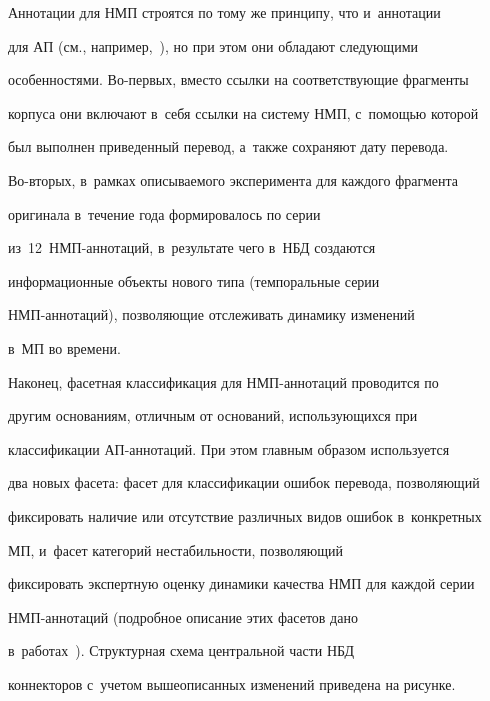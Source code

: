      


     Аннотации для НМП строятся по тому же принципу, что и~аннотации 


для АП (см., например,~\cite{18-ez}), но при этом они обладают сле\-ду\-ющи\-ми 


особенностями. Во-пер\-вых, вместо ссылки на соответствующие фрагменты 


корпуса они вклю\-ча\-ют в~себя ссылки на сис\-те\-му НМП, с~по\-мощью которой 


был выполнен приведенный перевод, а~также сохраняют дату перевода.  


Во-вто\-рых, в~рамках описываемого эксперимента для каждого фрагмента 


оригинала в~течение года формировалось по серии  


из~12~НМП-ан\-но\-та\-ций, в~результате чего в~НБД создаются 


информационные объекты нового типа (темпоральные серии 


 НМП-ан\-но\-та\-ций), поз\-во\-ля\-ющие отслеживать динамику изменений 


в~МП во времени.


     


     Наконец, фасетная классификация для НМП-аннотаций проводится по 


другим основаниям, отличным от оснований, использующихся при 


классификации АП-ан\-но\-та\-ций. При этом главным образом используется 


два новых фасета: фасет для классификации ошибок перевода, позволяющий 


фиксировать наличие или отсутствие различных видов ошибок в~конкретных 


МП, и~фасет категорий не\-ста\-биль\-ности, поз\-во\-ля\-ющий 


фиксировать экспертную оценку динамики качества НМП для каждой серии 


НМП-ан\-но\-та\-ций (подробное описание этих фасетов дано  


в~работах~\cite{6-ez, 16-ez}). Структурная схема центральной час\-ти НБД 


коннекторов с~учетом вышеописанных изменений приведена на рисунке.








     


